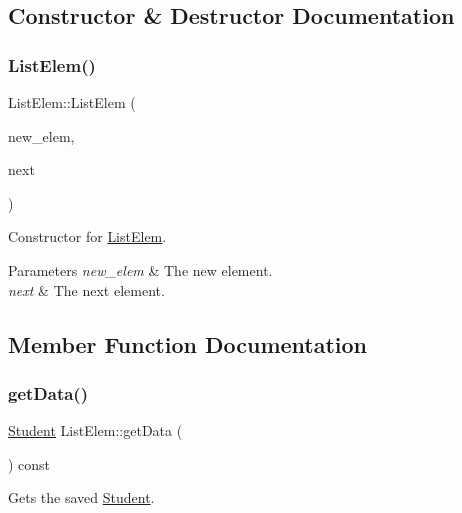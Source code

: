 \subsection{Constructor \& Destructor Documentation}
\mbox{\label{class_list_elem_ac8cf55d0466edb81548dbfbfe931adb1}} 
\subsubsection{\texorpdfstring{List\+Elem()}{ListElem()}}
{\footnotesize\ttfamily List\+Elem\+::\+List\+Elem (\begin{DoxyParamCaption}\item[{const \hyperlink{class_student}{Student} \&}]{new\+\_\+elem,  }\item[{\hyperlink{class_list_elem}{List\+Elem} $\ast$const}]{next }\end{DoxyParamCaption})}



Constructor for \hyperlink{class_list_elem}{List\+Elem}. 


\begin{DoxyParams}{Parameters}
{\em new\+\_\+elem} & The new element. \\
\hline
{\em next} & The next element. \\
\hline
\end{DoxyParams}


\subsection{Member Function Documentation}
\mbox{\label{class_list_elem_af80ce8c80d9e4dfa450d9272c965e110}} 
\subsubsection{\texorpdfstring{get\+Data()}{getData()}}
{\footnotesize\ttfamily \hyperlink{class_student}{Student} List\+Elem\+::get\+Data (\begin{DoxyParamCaption}{ }\end{DoxyParamCaption}) const}



Gets the saved \hyperlink{class_student}{Student}. 

